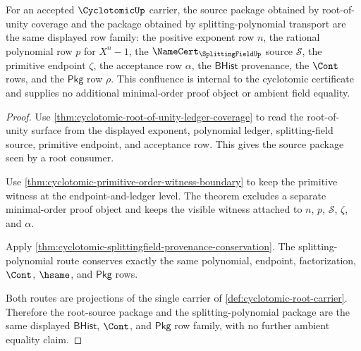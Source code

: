 \begin{theorem}
\label{thm:cyclotomic-root-source-provenance-confluence}
For an accepted $\CyclotomicUp$ carrier, the source package obtained by root-of-unity coverage and the package obtained by splitting-polynomial transport are the same displayed row family: the positive exponent row $n$, the rational polynomial row $p$ for $X^n-1$, the $\NameCert_{\SplittingFieldUp}$ source $\mathcal{S}$, the primitive endpoint $\zeta$, the acceptance row $\alpha$, the $\mathsf{BHist}$ provenance, the $\Cont$ rows, and the $\mathsf{Pkg}$ row $\rho$. This confluence is internal to the cyclotomic certificate and supplies no additional minimal-order proof object or ambient field equality.
\end{theorem}
\begin{proof}
Use \autoref{thm:cyclotomic-root-of-unity-ledger-coverage} to read the root-of-unity surface from the displayed exponent, polynomial ledger, splitting-field source, primitive endpoint, and acceptance row. This gives the source package seen by a root consumer.

Use \autoref{thm:cyclotomic-primitive-order-witness-boundary} to keep the primitive witness at the endpoint-and-ledger level. The theorem excludes a separate minimal-order proof object and keeps the visible witness attached to $n$, $p$, $\mathcal{S}$, $\zeta$, and $\alpha$.

Apply \autoref{thm:cyclotomic-splittingfield-provenance-conservation}. The splitting-polynomial route conserves exactly the same polynomial, endpoint, factorization, $\Cont$, $\hsame$, and $\mathsf{Pkg}$ rows.

Both routes are projections of the single carrier of \autoref{def:cyclotomic-root-carrier}. Therefore the root-source package and the splitting-polynomial package are the same displayed $\mathsf{BHist}$, $\Cont$, and $\mathsf{Pkg}$ row family, with no further ambient equality claim.
\end{proof}

